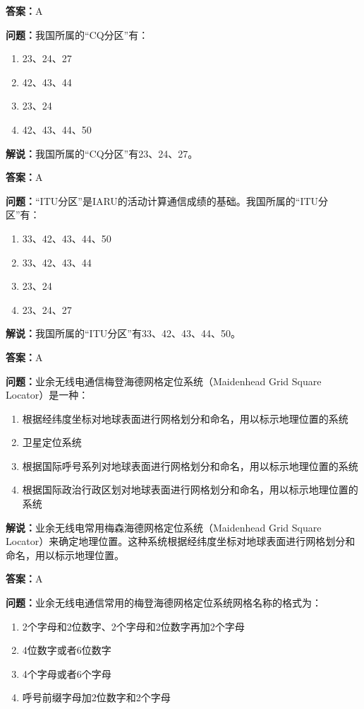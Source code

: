 \textbf{答案：}A

\textbf{问题：}我国所属的“CQ分区”有：

\begin{enumerate}[label=\Alph*), leftmargin=1cm]
	\item 23、24、27
	\item 42、43、44
	\item 23、24
	\item 42、43、44、50
\end{enumerate}

\textbf{解说：}我国所属的“CQ分区”有23、24、27。

\textbf{答案：}A

\textbf{问题：}“ITU分区”是IARU的活动计算通信成绩的基础。我国所属的“ITU分区”有：

\begin{enumerate}[label=\Alph*), leftmargin=1cm]
	\item 33、42、43、44、50
	\item 33、42、43、44
	\item 23、24
	\item 23、24、27
\end{enumerate}

\textbf{解说：}我国所属的“ITU分区”有33、42、43、44、50。

\textbf{答案：}A

\textbf{问题：}业余无线电通信梅登海德网格定位系统（Maidenhead Grid Square Locator）是一种：

\begin{enumerate}[label=\Alph*), leftmargin=1cm]
	\item 根据经纬度坐标对地球表面进行网格划分和命名，用以标示地理位置的系统
	\item 卫星定位系统
	\item 根据国际呼号系列对地球表面进行网格划分和命名，用以标示地理位置的系统
	\item 根据国际政治行政区划对地球表面进行网格划分和命名，用以标示地理位置的系统
\end{enumerate}

\textbf{解说：}业余无线电常用梅森海德网格定位系统（Maidenhead Grid Square Locator）来确定地理位置。这种系统根据经纬度坐标对地球表面进行网格划分和命名，用以标示地理位置。

\textbf{答案：}A

\textbf{问题：}业余无线电通信常用的梅登海德网格定位系统网格名称的格式为：

\begin{enumerate}[label=\Alph*), leftmargin=1cm]
	\item 2个字母和2位数字、2个字母和2位数字再加2个字母
	\item 4位数字或者6位数字
	\item 4个字母或者6个字母
	\item 呼号前缀字母加2位数字和2个字母
\end{enumerate}

